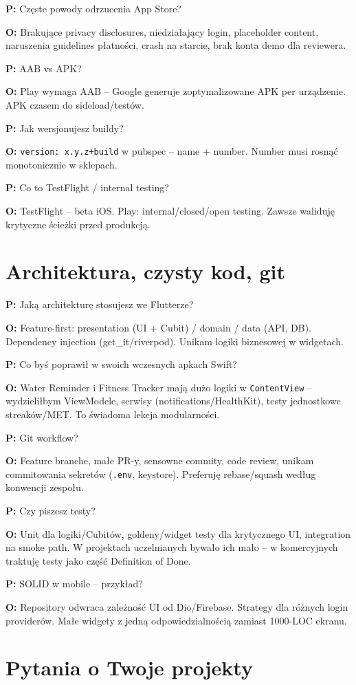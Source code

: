 \documentclass[11pt,a4paper]{article}
\newcommand{\pyt}[1]{\par\medskip\noindent\textbf{P:} #1\par}
\newcommand{\odp}[1]{\noindent\textbf{O:} #1\par}
\begin{document}
\pyt{Częste powody odrzucenia App Store?}
\odp{Brakujące privacy disclosures, niedziałający login, placeholder content, naruszenia guidelines płatności, crash na starcie, brak konta demo dla reviewera.}

\pyt{AAB vs APK?}
\odp{Play wymaga AAB -- Google generuje zoptymalizowane APK per urządzenie. APK czasem do sideload/testów.}

\pyt{Jak wersjonujesz buildy?}
\odp{\texttt{version: x.y.z+build} w pubspec -- name + number. Number musi rosnąć monotonicznie w sklepach.}

\pyt{Co to TestFlight / internal testing?}
\odp{TestFlight -- beta iOS. Play: internal/closed/open testing. Zawsze waliduję krytyczne ścieżki przed produkcją.}

\section{Architektura, czysty kod, git}

\pyt{Jaką architekturę stosujesz we Flutterze?}
\odp{Feature-first: presentation (UI + Cubit) / domain / data (API, DB). Dependency injection (get\_it/riverpod). Unikam logiki biznesowej w widgetach.}

\pyt{Co byś poprawił w swoich wczesnych apkach Swift?}
\odp{Water Reminder i Fitness Tracker mają dużo logiki w \texttt{ContentView} -- wydzieliłbym ViewModele, serwisy (notifications/HealthKit), testy jednostkowe streaków/MET. To świadoma lekcja modularności.}

\pyt{Git workflow?}
\odp{Feature branche, małe PR-y, sensowne commity, code review, unikam commitowania sekretów (\texttt{.env}, keystore). Preferuję rebase/squash według konwencji zespołu.}

\pyt{Czy piszesz testy?}
\odp{Unit dla logiki/Cubitów, goldeny/widget testy dla krytycznego UI, integration na smoke path. W projektach uczelnianych bywało ich mało -- w komercyjnych traktuję testy jako część Definition of Done.}

\pyt{SOLID w mobile -- przykład?}
\odp{Repository odwraca zależność UI od Dio/Firebase. Strategy dla różnych login providerów. Małe widgety z jedną odpowiedzialnością zamiast 1000-LOC ekranu.}

\section{Pytania o Twoje projekty}
\end{document}
